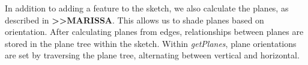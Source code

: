 In addition to adding a feature to the sketch, we also calculate the
planes, as described in \textbf{\textgreater{}\textgreater{}MARISSA}.
This allows us to shade planes based on orientation. After calculating
planes from edges, relationships between planes are stored in the plane
tree within the sketch. Within \emph{getPlanes}, plane orientations are
set by traversing the plane tree, alternating between vertical and
horizontal.

